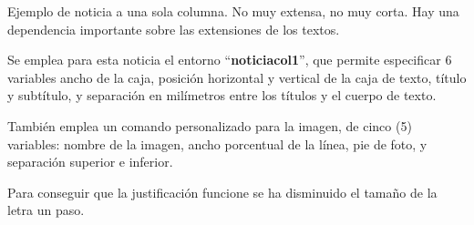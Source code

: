 Ejemplo de noticia a una sola columna. No muy extensa, no muy corta. Hay una dependencia importante sobre las extensiones de los textos.


Se emplea para esta noticia el entorno \enquote{\textbf{noticiacol1}}, que permite especificar 6 variables ancho de la caja, posición horizontal y vertical de la caja de texto, título y subtítulo, y separación en milímetros entre los títulos y el cuerpo de texto.


También emplea un comando personalizado para la imagen, de cinco (5) variables: nombre de la imagen, ancho porcentual de la línea, pie de foto, y separación superior e inferior.

Para conseguir que la justificación funcione se ha disminuido el tamaño de la letra un paso.